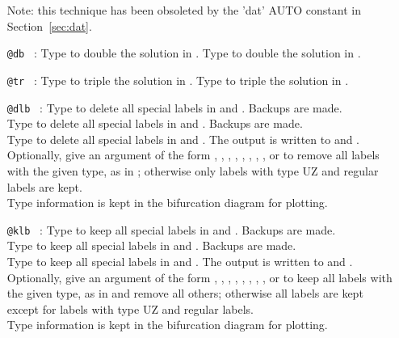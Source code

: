 \documentclass[12pt]{report}
\begin{document}
\begin{itemize}
  Note: this technique has been obsoleted by the 'dat' AUTO constant
  in Section~\ref{sec:dat}.

\item[\tt @db]~:
  Type  to double the solution in .
  Type  to double the solution in .

\item[\tt @tr]~:
  Type  to triple the solution in .
  Type  to triple the solution in .

\item[\tt @dlb]~:
  Type  to delete all special labels in  and
  . Backups are made.\\
  Type  to delete all special labels in  and
  . Backups are made.\\
  Type  to delete all special labels in  and
  . The output is written to  and
  .\\
  Optionally, give an argument of the form
  , , , , ,
  , , , or  to
  remove all labels with the given type, as in
  ; otherwise only labels with type UZ and
  regular labels are kept.\\
  Type information is kept in the bifurcation diagram for plotting.

\item[\tt @klb]~:
  Type  to keep all special labels in  and
  . Backups are made.\\
  Type  to keep all special labels in  and
  . Backups are made.\\
  Type  to keep all special labels in  and
  . The output is written to  and
  .\\
  Optionally, give an argument of the form
  , , , , ,
  , , , or  to
  keep all labels with the given type, as in
   and remove all others;
  otherwise all labels are kept except for labels with type UZ and regular labels.\\
  Type information is kept in the bifurcation diagram for plotting.


\end{itemize}
\end{document}
